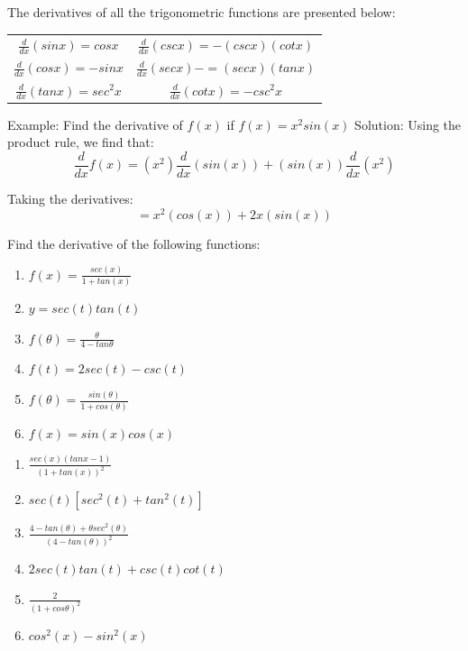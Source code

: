 The derivatives of all the trigonometric functions are presented below:
\begin{center}
\begin{tabular}{ |c|c| } 
 \hline
 $\frac{d}{dx}(sinx)=cosx$ & $\frac{d}{dx}(cscx)=-(cscx)(cotx)$ \\ 
 $\frac{d}{dx}(cosx)=-sinx$ & $\frac{d}{dx}(secx)-=(secx)(tanx)$  \\ 
 $\frac{d}{dx}(tanx)=sec^2x$ & $\frac{d}{dx}(cotx)=-csc^2x$  \\ 
 \hline
\end{tabular}
\end{center}

Example: Find the derivative of $f(x)$ if $f(x) = x^2sin(x)$
Solution: Using the product rule, we find that: $$\frac{d}{dx}f(x)=(x^2)\frac{d}{dx}(sin(x))+(sin(x))\frac{d}{dx}(x^2)$$

Taking the derivatives:
$$=x^2(cos(x))+2x(sin(x))$$

\begin{Exercise}[title = Derivatives of Trig Functions 2, label=trigderiv2]
    Find the derivative of the following functions:
    \begin{enumerate}
        \item $f(x) = \frac{sec(x)}{1+tan(x)}$
        \item $y=sec(t)tan(t)$
        \item $f(\theta) = \frac{\theta}{4-tan\theta}$
        \item $f(t) = 2sec(t) - csc(t)$
        \item $f(\theta) = \frac{sin(\theta)}{1+cos(\theta)}$
        \item $f(x) = sin(x)cos(x)$
    \end{enumerate}
\end{Exercise}

\begin{Answer}
    [ref=trigderiv2]
    \begin{enumerate}
        \item $\frac{sec(x)(tanx-1)}{(1+tan(x))^2}$
        \item $sec(t)[sec^2(t)+tan^2(t)]$
        \item $\frac{4-tan(\theta)+\theta sec^2(\theta)}{(4-tan(\theta))^2}$
        \item $2sec(t)tan(t)+csc(t)cot(t)$
        \item $\frac{2}{(1+cos\theta)^2}$
        \item $cos^2(x) - sin^2(x)$
    \end{enumerate}
\end{Answer}


